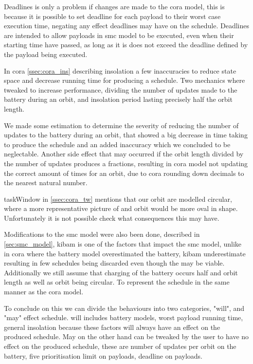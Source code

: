 Deadlines is only a problem if changes are made to the \gls{cora} model, this is because it is possible to set deadline for each payload to their worst case execution time, negating any effect deadlines may have on the schedule. Deadlines are intended to allow payloads in \gls{smc} model to be executed, even when their starting time have passed, as long as it is does not exceed the deadline defined by the payload being executed.

In \gls{cora} \cref{ssec:cora_ins} describing insolation a few inaccuracies to reduce state space and decrease running time for producing a schedule. Two mechanics where tweaked to increase performance, dividing the number of updates made to the battery during an orbit, and insolation period lasting precisely half the orbit length.

We made some estimation to determine the severity of reducing the number of updates to the battery during an orbit, that showed a big decrease in time taking to produce the schedule and an added inaccuracy which we concluded to be neglectable. Another side effect that may occurred  if the orbit length divided by the number of updates produces a fractions, resulting in \gls{cora} model not updating the correct amount of times for an orbit, due to \gls{cora}  rounding down decimals to the nearest natural number.

taskWindow in \cref{ssec:cora_tw} mentions that our orbit are modelled circular, where a more representative picture of and orbit would be more oval in shape. Unfortunately it is not possible check what consequences this may have.

Modifications to the \gls{smc} model were also been done, described in \cref{sec:smc_model}, \gls{kibam} is one of the factors that impact the \gls{smc} model, unlike in \gls{cora} where the battery model overestimated the battery, \gls{kibam} underestimate resulting in few schedules being discarded even though the may be viable. Additionally we still assume that charging of the battery occurs half and orbit length as well as orbit being circular. To represent the schedule in the same manner as the \gls{cora} model.

To conclude on this we can divide the behaviours into two categories, "will", and "may" effect schedule. will includes battery models, worst payload running time, general insolation because these factors will always have an effect on the produced schedule. May on the other hand can be tweaked by the user to have no effect on the produced schedule, these are number of updates per orbit on the battery, five prioritisation limit on payloads, deadline on payloads.








